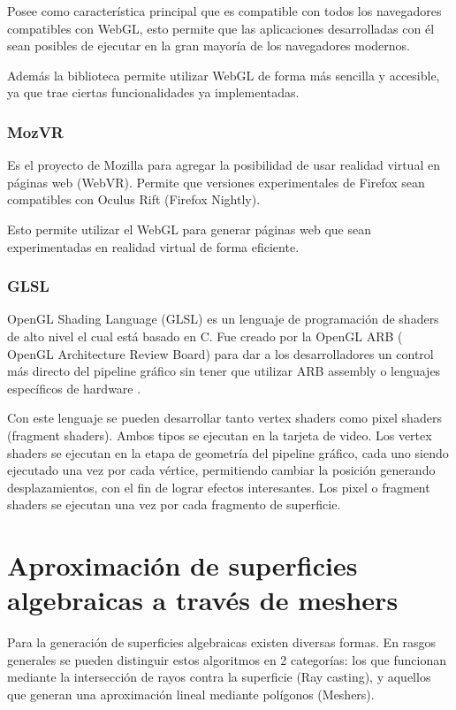 \documentclass[12pt]{article}
\begin{document}
Posee como característica principal que es compatible con todos los navegadores compatibles con WebGL, esto permite que las aplicaciones desarrolladas con él sean posibles de ejecutar en la gran mayoría de los navegadores modernos.

Además la biblioteca permite utilizar WebGL de forma más sencilla y accesible, ya que trae ciertas funcionalidades ya implementadas.
\subsubsection{MozVR}
\noindent Es el proyecto de Mozilla para agregar la posibilidad de usar realidad virtual en páginas web (WebVR)\cite{mozvr}. Permite que versiones experimentales de Firefox sean compatibles con Oculus Rift (Firefox Nightly\cite{nightly}).

Esto permite utilizar el WebGL para generar páginas web que sean experimentadas en realidad virtual de forma eficiente.
\subsubsection{GLSL}
\noindent OpenGL Shading Language (GLSL) es un lenguaje de programación de shaders de alto nivel el cual está basado en C. Fue creado por la OpenGL ARB ( OpenGL Architecture Review Board) para dar a los desarrolladores un control más directo del pipeline gráfico sin tener que utilizar ARB assembly o lenguajes específicos de hardware .

Con este lenguaje se pueden desarrollar tanto vertex shaders como pixel shaders (fragment shaders). Ambos tipos se ejecutan en la tarjeta de video. Los vertex shaders se ejecutan en la etapa de geometría del pipeline gráfico, cada uno siendo ejecutado una vez por cada vértice, permitiendo cambiar la posición generando desplazamientos, con el fin de lograr efectos interesantes. Los pixel o fragment shaders se ejecutan una vez por cada fragmento de superficie.

\clearpage
\section{Aproximación de superficies algebraicas a través de meshers}
\noindent Para la generación de superficies algebraicas existen diversas formas. En rasgos generales se pueden distinguir estos algoritmos en 2 categorías: los que funcionan mediante la intersección de rayos contra la superficie (Ray casting), y aquellos que generan una aproximación lineal mediante polígonos (Meshers).
\end{document}
